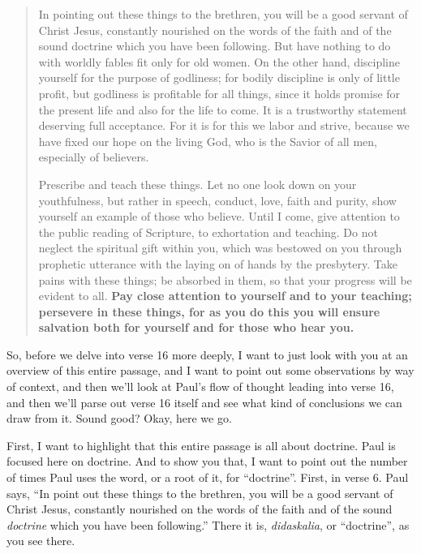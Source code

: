 \documentclass[letterpaper, 12pt]{article}
\begin{document}
    \begin{quote}

        In pointing out these things to the brethren, you will be a good
        servant of Christ Jesus, constantly nourished on the words of
        the faith and of the sound doctrine which you have been
        following. But have nothing to do with worldly fables fit only
        for old women. On the other hand, discipline yourself for the
        purpose of godliness; for bodily discipline is only of little
        profit, but godliness is profitable for all things, since it
        holds promise for the present life and also for the life to
        come. It is a trustworthy statement deserving full acceptance.
        For it is for this we labor and strive, because we have fixed
        our hope on the living God, who is the Savior of all men,
        especially of believers.

        Prescribe and teach these things. Let no one look down on your
        youthfulness, but rather in speech, conduct, love, faith and
        purity, show yourself an example of those who believe. Until I
        come, give attention to the public reading of Scripture, to
        exhortation and teaching. Do not neglect the spiritual gift
        within you, which was bestowed on you through prophetic
        utterance with the laying on of hands by the presbytery. Take
        pains with these things; be absorbed in them, so that your
        progress will be evident to all. \textbf{Pay close attention to
        yourself and to your teaching; persevere in these things, for as
        you do this you will ensure salvation both for yourself and for
        those who hear you.}

    \end{quote}

    So, before we delve into verse 16 more deeply, I want to just look
    with you at an overview of this entire passage, and I want to point
    out some observations by way of context, and then we'll look at
    Paul's flow of thought leading into verse 16, and then we'll parse
    out verse 16 itself and see what kind of conclusions we can draw
    from it. Sound good? Okay, here we go.

    First, I want to highlight that this entire passage is all about
    doctrine. Paul is focused here on doctrine. And to show you that, I
    want to point out the number of times Paul uses the word, or a root
    of it, for ``doctrine''. First, in verse 6. Paul says, ``In point
    out these things to the brethren, you will be a good servant of
    Christ Jesus, constantly nourished on the words of the faith and of
    the sound \emph{doctrine} which you have been following.'' There it
    is, \emph{didaskalia}, or ``doctrine'', as you see there.
\end{document}
